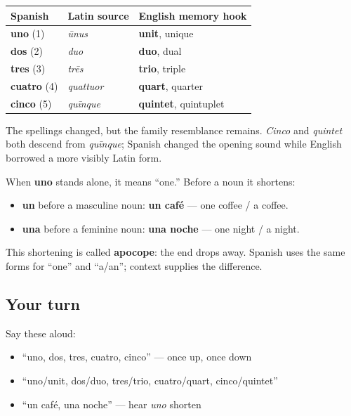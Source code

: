 \begin{cousinweb}
\noindent
\begin{tabularx}{\linewidth}{@{}>{\raggedright\arraybackslash}X>{\raggedright\arraybackslash}X>{\raggedright\arraybackslash}X@{}}
\toprule
\textbf{Spanish} & \textbf{Latin source} & \textbf{English memory hook} \\
\midrule
\textbf{uno} (1) & \emph{ūnus} & \textbf{unit}, unique \\
\textbf{dos} (2) & \emph{duo} & \textbf{duo}, dual \\
\textbf{tres} (3) & \emph{trēs} & \textbf{trio}, triple \\
\textbf{cuatro} (4) & \emph{quattuor} & \textbf{quart}, quarter \\
\textbf{cinco} (5) & \emph{quīnque} & \textbf{quintet}, quintuplet \\
\bottomrule
\end{tabularx}

The spellings changed, but the family resemblance remains. \emph{Cinco} and \emph{quintet} both descend from \emph{quīnque}; Spanish changed the opening sound while English borrowed a more visibly Latin form.
\end{cousinweb}

\begin{grammarlens}[title={Grammar Lens: uno becomes un or una}]
When \textbf{uno} stands alone, it means “one.” Before a noun it shortens:

\begin{itemize}
\raggedright
  \item \textbf{un} before a masculine noun: \textbf{un café} — one coffee / a coffee.
  \item \textbf{una} before a feminine noun: \textbf{una noche} — one night / a night.
\end{itemize}

This shortening is called \textbf{apocope}: the end drops away. Spanish uses the same forms for “one” and “a/an”; context supplies the difference.
\end{grammarlens}

\subsection*{Your turn}
Say these aloud:

\begin{itemize}
\raggedright
  \item “uno, dos, tres, cuatro, cinco” — once up, once down
  \item “uno/unit, dos/duo, tres/trio, cuatro/quart, cinco/quintet”
  \item “un café, una noche” — hear \emph{uno} shorten
\end{itemize}

